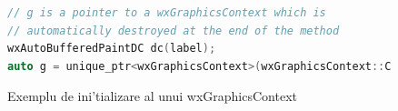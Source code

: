 \begin{figure}[H]
\begin{lstlisting}[language=C++]
// g is a pointer to a wxGraphicsContext which is 
// automatically destroyed at the end of the method
wxAutoBufferedPaintDC dc(label);
auto g = unique_ptr<wxGraphicsContext>(wxGraphicsContext::Create(dc)).get();
\end{lstlisting}
\caption{Exemplu de ini'tializare al unui wxGraphicsContext}
\label{fig0510}
\end{figure}